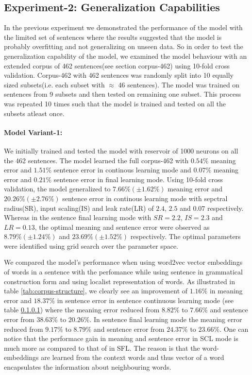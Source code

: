 \subsection{Experiment-2: Generalization Capabilities} \label{exp-2}

In the previous experiment we demonstrated the performance of the model with the limited set of sentences where the results suggested that the model is probably overfitting and not generalizing on unseen data. So in order to test the generalization capability of the model, we examined the model behaviour with an extended corpus of 462 sentences(see section corpus-462) using 10-fold cross validation. Corpus-462 with 462 sentences was randomly split into 10 equally sized subsets(i.e. each subset with $\approx$ 46 sentences). The model was trained on sentences from 9 subsets and then tested on remaining one subset. This process was repeated 10 times such that the model is trained and tested on all the subsets atleast once. 

\paragraph{Model Variant-1:} We initially trained and tested the model with reservoir of 1000 neurons on all the 462 sentences. The model learned the full corpus-462 with $0.54\%$ meaning error and $1.51\%$ sentence error in continous learning mode and $0.07\%$ meaning error and $0.21\%$ sentence error in final learning mode. Using 10-fold cross validation, the model generalized to $7.66\% (\pm 1.62\%) $ meaning error and $20.26\% (\pm 2.76\%)$ sentence error in continous learning mode with sepctral radius(SR), input scaling(IS) and leak rate(LR) of $2.4$, $2.5$ and $0.07$ respectively. Whereas in the sentence final learning mode with $SR = 2.2$, $IS = 2.3$ and $LR = 0.13$, the optimal meaning and sentence error were observed as $8.79\% (\pm 1.24\%)$ and $23.69\% (\pm 1.52\%)$ respectively. The optimal parameters were identified using grid search over the parameter space.

We compared the model's performance when using word2vec vector embeddings of words in a sentence with the perfomance while using sentence in grammatical construction form and using localist representation of words. As illustrated in table \ref{tab:corpus-structure}, we clearly see an improvement of $1.16 \%$ in meaning error and $18.37 \%$ in sentence error in sentence continuous learning mode (see table \ref{}) where the meaning error reduced from $8.82 \%$ to $7.66 \%$ and sentence error from $38.63 \%$ to $20.26 \%$. In sentence final learning mode the meaning error reduced from  $9.17 \%$ to $ 8.79 \%$ and sentence error from $24.37 \%$ to $23.66 \%$. One can notice that the performace gain in meaning and sentence error in SCL mode is much more as compared to that of in SFL. The reason is that the word-embeddings are learned from the context words and thus vector of a word encapsulates the information about neighbouring words. 
	
